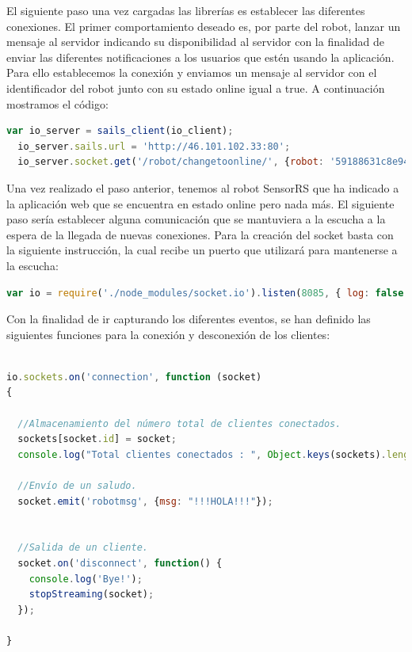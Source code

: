 El siguiente paso una vez cargadas las librerías es establecer las diferentes conexiones. El primer comportamiento deseado es, por parte del robot, lanzar un mensaje al servidor indicando su disponibilidad al servidor con la finalidad de
enviar las diferentes notificaciones a los usuarios que estén usando la aplicación. Para ello establecemos la conexión y enviamos un mensaje al servidor con el identificador del robot junto con su estado online igual a true. A continuación mostramos
el código:\\

\begin{lstlisting}[language=JavaScript]
  var io_server = sails_client(io_client);
  io_server.sails.url = 'http://46.101.102.33:80';
  io_server.socket.get('/robot/changetoonline/', {robot: '59188631c8e94ba54f7a4bdc', online: true});
\end{lstlisting}

Una vez realizado el paso anterior, tenemos al robot SensorRS que ha indicado a la aplicación web que se encuentra en estado online pero nada más. El siguiente paso sería establecer alguna 
comunicación que se mantuviera a la escucha a la espera de la llegada de nuevas conexiones. Para la creación del socket basta con la siguiente instrucción, la cual recibe un puerto que 
utilizará para mantenerse a la escucha:\\

\begin{lstlisting}[language=JavaScript]
  var io = require('./node_modules/socket.io').listen(8085, { log: false });
\end{lstlisting}


Con la finalidad de ir capturando los diferentes eventos, se han definido las siguientes funciones para la conexión y desconexión de los clientes:\\

\begin{lstlisting}[language=JavaScript]

io.sockets.on('connection', function (socket)
{

  //Almacenamiento del número total de clientes conectados.
  sockets[socket.id] = socket;
  console.log("Total clientes conectados : ", Object.keys(sockets).length);
  
  //Envío de un saludo.
  socket.emit('robotmsg', {msg: "!!!HOLA!!!"});


  //Salida de un cliente.
  socket.on('disconnect', function() {
    console.log('Bye!');
    stopStreaming(socket);
  });  
  
}
\end{lstlisting}


